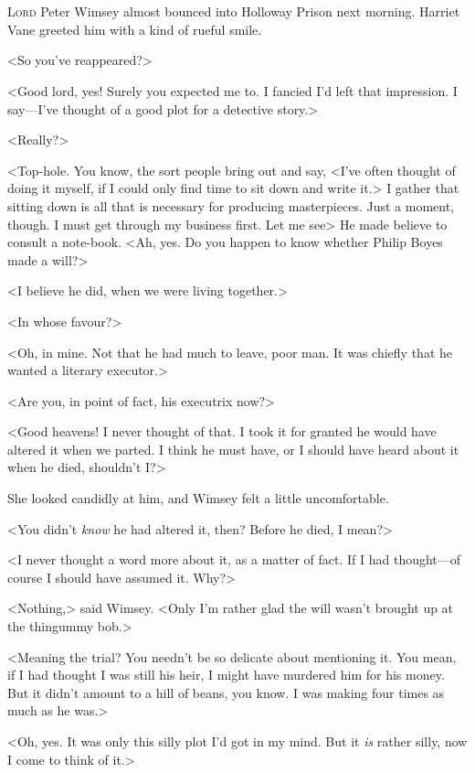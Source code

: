 \chapter[Chapter \thechapter]{}
\lettrine{L}{ord} Peter Wimsey almost bounced into Holloway Prison next morning. Harriet Vane greeted him with a kind of rueful smile.

\zz
<So you've reappeared?>

\zz
<Good lord, yes! Surely you expected me to. I fancied I'd left that impression. I say—I've thought of a good plot for a detective story.>

<Really?>

<Top-hole. You know, the sort people bring out and say, <I've often thought of doing it myself, if I could only find time to sit down and write it.> I gather that sitting down is all that is necessary for producing masterpieces. Just a moment, though. I must get through my business first. Let me see\longdash> He made believe to consult a note-book. <Ah, yes. Do you happen to know whether Philip Boyes made a will?>

<I believe he did, when we were living together.>

<In whose favour?>

<Oh, in mine. Not that he had much to leave, poor man. It was chiefly that he wanted a literary executor.>

<Are you, in point of fact, his executrix now?>

<Good heavens! I never thought of that. I took it for granted he would have altered it when we parted. I think he must have, or I should have heard about it when he died, shouldn't I?>

She looked candidly at him, and Wimsey felt a little uncomfortable.

<You didn't \emph{know} he had altered it, then? Before he died, I mean?>

<I never thought a word more about it, as a matter of fact. If I had thought—of course I should have assumed it. Why?>

<Nothing,> said Wimsey. <Only I'm rather glad the will wasn't brought up at the thingummy bob.>

<Meaning the trial? You needn't be so delicate about mentioning it. You mean, if I had thought I was still his heir, I might have murdered him for his money. But it didn't amount to a hill of beans, you know. I was making four times as much as he was.>

<Oh, yes. It was only this silly plot I'd got in my mind. But it \emph{is} rather silly, now I come to think of it.>

